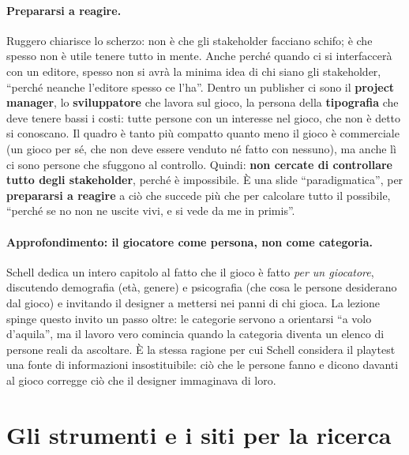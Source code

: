 \paragraph{Prepararsi a reagire.} Ruggero chiarisce lo scherzo: non è che gli
stakeholder facciano schifo; è che spesso non è utile tenere tutto in mente. Anche
perché quando ci si interfaccerà con un editore, spesso non si avrà la minima idea di
chi siano gli stakeholder, ``perché neanche l'editore spesso ce l'ha''. Dentro un
publisher ci sono il \textbf{project manager}, lo \textbf{sviluppatore} che lavora sul
gioco, la persona della \textbf{tipografia} che deve tenere bassi i costi: tutte
persone con un interesse nel gioco, che non è detto si conoscano. Il quadro è tanto più
compatto quanto meno il gioco è commerciale (un gioco per sé, che non deve essere
venduto né fatto con nessuno), ma anche lì ci sono persone che sfuggono al controllo.
Quindi: \textbf{non cercate di controllare tutto degli stakeholder}, perché è
impossibile. È una slide ``paradigmatica'', per \textbf{prepararsi a reagire} a ciò che
succede più che per calcolare tutto il possibile, ``perché se no non ne uscite vivi, e
si vede da me in primis''.

\paragraph{Approfondimento: il giocatore come persona, non come categoria.} Schell
dedica un intero capitolo al fatto che il gioco è fatto \emph{per un giocatore},
discutendo demografia (età, genere) e psicografia (che cosa le persone desiderano dal
gioco) e invitando il designer a mettersi nei panni di chi gioca. La lezione spinge
questo invito un passo oltre: le categorie servono a orientarsi ``a volo d'aquila'',
ma il lavoro vero comincia quando la categoria diventa un elenco di persone reali da
ascoltare. È la stessa ragione per cui Schell considera il playtest una fonte di
informazioni insostituibile: ciò che le persone fanno e dicono davanti al gioco
corregge ciò che il designer immaginava di loro.

\section{Gli strumenti e i siti per la ricerca}
\label{a6:sec:strumenti}



